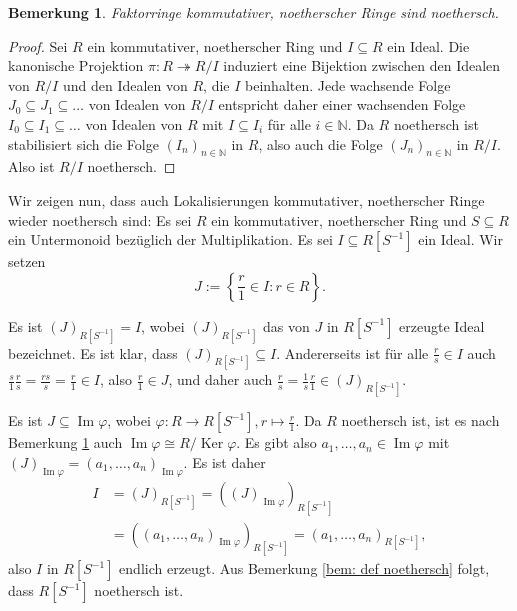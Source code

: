 \documentclass[a4paper,10pt]{article}
\newcounter{satze}
\newtheorem{bem}[satze]{Bemerkung}
\theoremstyle{definition}
\newcommand{\N}{\mathbb{N}}
\newcommand{\Img}{\operatorname{Im}}
\newcommand{\Ker}{\operatorname{Ker}}
\begin{document}
\begin{bem}\label{bem: faktorringe noethersch}
 Faktorringe kommutativer, noetherscher Ringe sind noethersch.
\end{bem}
\begin{proof}
 Sei $R$ ein kommutativer, noetherscher Ring und $I \subseteq R$ ein Ideal. Die kanonische Projektion $\pi : R \twoheadrightarrow R/I$ induziert eine Bijektion zwischen den Idealen von $R/I$ und den Idealen von $R$, die $I$ beinhalten. Jede wachsende Folge $J_0 \subseteq J_1 \subseteq \ldots$ von Idealen von $R/I$ entspricht daher einer wachsenden Folge $I_0 \subseteq I_1 \subseteq \ldots$ von Idealen von $R$ mit $I \subseteq I_i$ für alle $i \in \N$. Da $R$ noethersch ist stabilisiert sich die Folge $(I_n)_{n \in \N}$ in $R$, also auch die Folge $(J_n)_{n \in \N}$ in $R/I$. Also ist $R/I$ noethersch.
\end{proof}


Wir zeigen nun, dass auch Lokalisierungen kommutativer, noetherscher Ringe wieder noethersch sind: Es sei $R$ ein kommutativer, noetherscher Ring und $S \subseteq R$ ein Untermonoid bezüglich der Multiplikation. Es sei $I \subseteq R[S^{-1}]$ ein Ideal. Wir setzen
\[
 J := \left\{ \frac{r}{1} \in I : r \in R \right\}.
\]

Es ist $(J)_{R[S^{-1}]} = I$, wobei $(J)_{R[S^{-1}]}$ das von $J$ in $R[S^{-1}]$ erzeugte Ideal bezeichnet. Es ist klar, dass $(J)_{R[S^{-1}]} \subseteq I$. Andererseits ist für alle $\frac{r}{s} \in I$ auch $\frac{s}{1} \frac{r}{s} = \frac{rs}{s} = \frac{r}{1} \in I$, also $\frac{r}{1} \in J$, und daher auch $\frac{r}{s} = \frac{1}{s} \frac{r}{1} \in (J)_{R[S^{-1}]}$.

Es ist $J \subseteq \Img \varphi$, wobei $\varphi : R \rightarrow R[S^{-1}], r \mapsto \frac{r}{1}$. Da $R$ noethersch ist, ist es nach Bemerkung \ref{bem: faktorringe noethersch} auch $\Img \varphi \cong R / \Ker \varphi$. Es gibt also $a_1, \ldots, a_n \in \Img \varphi$ mit $(J)_{\Img \varphi} = (a_1, \ldots, a_n)_{\Img \varphi}$. Es ist daher
\begin{align*}
 I
 &= (J)_{R[S^{-1}]}
 = ((J)_{\Img \varphi})_{R[S^{-1}]} \\
 &= ((a_1, \ldots, a_n)_{\Img \varphi})_{R[S^{-1}]}
 = (a_1, \ldots, a_n)_{R[S^{-1}]},
\end{align*}
also $I$ in $R[S^{-1}]$ endlich erzeugt. Aus Bemerkung \ref{bem: def noethersch} folgt, dass $R[S^{-1}]$ noethersch ist.
\end{document}
